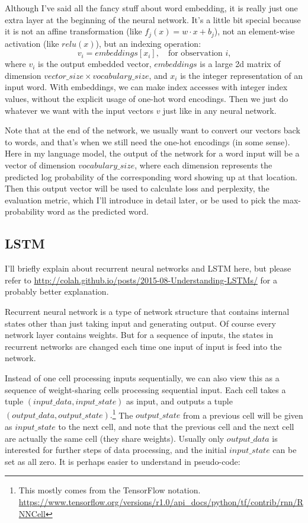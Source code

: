 \documentclass[a4paper]{article}
\begin{document}
Although I've said all the fancy stuff about word embedding, it is really just one extra layer at the beginning of the neural network. It's a little bit special because it is not an affine transformation (like $f_j(x) = w\cdot x+b_j$), not an element-wise activation (like $relu(x)$), but an indexing operation:
\begin{equation}
  v_i = embeddings[x_i], \quad \text{for observation $i$,}
\end{equation}
where $v_i$ is the output embedded vector, $embeddings$ is a large 2d matrix of dimension $vector\_size \times vocabulary\_size$, and $x_i$ is the integer representation of an input word. With embeddings, we can make index accesses with integer index values, without the explicit usage of one-hot word encodings. Then we just do whatever we want with the input vectors $v$ just like in any neural network.

Note that at the end of the network, we usually want to convert our vectors back to words, and that's when we still need the one-hot encodings (in some sense). Here in my language model, the output of the network for a word input will be a vector of dimension $vocabulary\_size$, where each dimension represents the predicted log probability of the corresponding word showing up at that location. Then this output vector will be used to calculate loss and perplexity, the evaluation metric, which I'll introduce in detail later, or be used to pick the max-probability word as the predicted word.

\subsection{LSTM}
I'll briefly explain about recurrent neural networks and LSTM here, but please refer to \cite{colahLSTM} \url{http://colah.github.io/posts/2015-08-Understanding-LSTMs/} for a probably better explanation.

Recurrent neural network is a type of network structure that contains internal states other than just taking input and generating output. Of course every network layer contains weights. But for a sequence of inputs, the states in recurrent networks are changed each time one input of input is feed into the network. 

Instead of one cell processing inputs sequentially, we can also view this as a sequence of weight-sharing cells processing sequential input. Each cell takes a tuple $(input\_data, input\_state)$ as input, and outputs a tuple $(output\_data, output\_state).$\footnote{This mostly comes from the TensorFlow notation. \url{https://www.tensorflow.org/versions/r1.0/api_docs/python/tf/contrib/rnn/RNNCell}} The $output\_state$ from a previous cell will be given as $input\_state$ to the next cell, and note that the previous cell and the next cell are actually the same cell (they share weights). Usually only $output\_data$ is interested for further steps of data processing, and the initial $input\_state$ can be set as all zero. It is perhaps easier to understand in pseudo-code:
\end{document}
